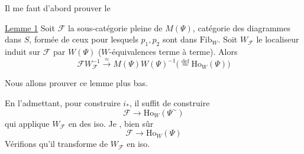 Il me faut  d'abord prouver le

\uline{Lemme 1} Soit $\mathscr F$ la sous-catégorie pleine de $M(\Psi)$, catégorie des diagrammes
dans $S$, formée de ceux pour lesquels $p_1,p_2$ sont dans $\mathrm{Fib}_W$. Soit $W_{\mathscr F}$ le localiseur induit sur $\mathscr F$ par $W(\Psi)$\unsure{,} ($W$-équivalences terme à terme). Alors
\[
\mathscr F W_{\mathscr F}^{-1}\xrightarrow{\approx}M(\Psi)W(\Psi)^{-1}
\bigl(\mathrel{\overset{\mathrm{def}}{=}}\mathrm{Ho}_W(\Psi)\bigr)
\]

Nous allons prouver ce lemme plus bas.

En l'admettant, pour construire $i_*$, il suffit de construire
\[
\mathscr F\longrightarrow\mathrm{Ho}_W(\Psi^{\sim})
\]
qui applique $W_{\mathscr F}$  en des iso. Je , bien sûr
\[
\mathscr F\longrightarrow\mathrm{Ho}_W(\Psi)
\]
Vérifions qu'il transforme  de $W_{\mathscr F}$ en iso.


